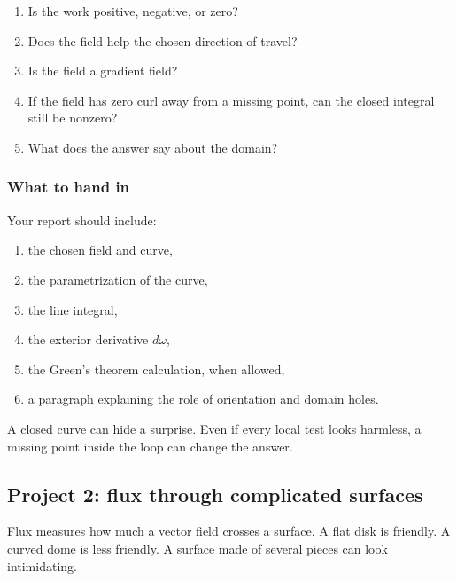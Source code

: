 \begin{enumerate}
\item Is the work positive, negative, or zero?

\item Does the field help the chosen direction of travel?

\item Is the field a gradient field?

\item If the field has zero curl away from a missing point, can the closed integral still
be nonzero?

\item What does the answer say about the domain?
\end{enumerate}

\subsubsection*{What to hand in}

Your report should include:

\begin{enumerate}
\item the chosen field and curve,

\item the parametrization of the curve,

\item the line integral,

\item the exterior derivative \(d\omega\),

\item the Green's theorem calculation, when allowed,

\item a paragraph explaining the role of orientation and domain holes.
\end{enumerate}

A closed curve can hide a surprise.  Even if every local test looks harmless, a missing
point inside the loop can change the answer.

\subsection{Project 2: flux through complicated surfaces}

Flux measures how much a vector field crosses a surface.  A flat disk is friendly.  A
curved dome is less friendly.  A surface made of several pieces can look intimidating.

